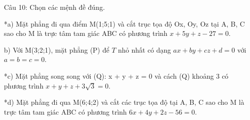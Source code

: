 \documentclass[a4paper,12pt]{article}
\begin{document}
Câu 10: Chọn các mệnh đề đúng.

*a) Mặt phẳng đi qua điểm M(1;5;1) và cắt trục tọa độ Ox, Oy, Oz tại A, B, C sao cho M là trực tâm tam giác ABC có phương trình \(x + 5y + z - 27 = 0\).

b) Với M(3;2;1), mặt phẳng (P) để \(T\) nhỏ nhất có dạng \(ax+by+cz+d=0\) với \(a=b=c=0\).

*c) Mặt phẳng song song với (Q): x + y + z = 0 và cách (Q) khoảng 3 có phương trình \(x + y + z + 3\sqrt{3} = 0\).

*d) Mặt phẳng đi qua M(6;4;2) và cắt các trục tọa độ tại A, B, C sao cho M là trực tâm tam giác ABC có phương trình \(6x + 4y + 2z - 56 = 0\).
\end{document}
